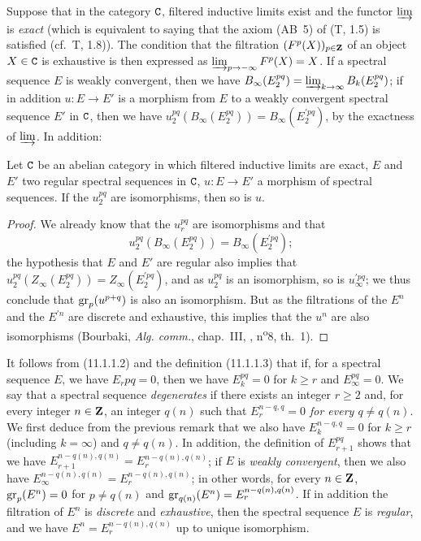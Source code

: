 \begin{env}[11.1.4]
\label{0.11.1.4}
Suppose that in the category $\mathtt{C}$, filtered inductive limits exist and the functor $\varinjlim$ is \emph{exact} (which is equivalent to saying that the axiom (AB~5) of (T, 1.5) is satisfied (cf.~T, 1.8)).
The condition that the filtration $(F^p(X))_{p\in\mathbf{Z}}$ of an object $X\in\mathtt{C}$ is exhaustive is then expressed as $\varinjlim_{p\to-\infty}F^p(X)=X$.
If a spectral sequence $E$ is weakly convergent, then we have $B_\infty(E_2^{pq})=\varinjlim_{k\to\infty}B_k(E_2^{pq})$; if in addition $u:E\to E'$ is a morphism from $E$ to a weakly convergent spectral sequence $E'$ in $\mathtt{C}$, then we have $u_2^{pq}(B_\infty(E_2^{pq}))=B_\infty(E_2^{\prime pq})$, by the exactness of $\varinjlim$.
In addition:
\end{env}

\begin{prop}[11.1.5]
\label{0.11.1.5}
Let $\mathtt{C}$ be an abelian category in which filtered inductive limits are exact, $E$ and $E'$ two regular spectral sequences in $\mathtt{C}$, $u:E\to E'$ a morphism of spectral sequences.
If the $u_2^{pq}$ are isomorphisms, then so is $u$.
\end{prop}

\begin{proof}
\label{proof-0.11.1.5}
We already know  that the $u_r^{pq}$ are isomorphisms and that
\[
  u_2^{pq}(B_\infty(E_2^{pq}))=B_\infty(E_2^{\prime pq});
\]
the hypothesis that $E$ and $E'$ are regular also implies that $u_2^{pq}(Z_\infty(E_2^{pq}))=Z_\infty(E_2^{\prime pq})$, and as $u_2^{pq}$ is an isomorphism, so is $u_\infty^{\prime pq}$; we thus conclude that ${\mathop{\mathrm{gr}}\nolimits}_p(u^{p+q})$ is also an isomorphism.
But as the filtrations of the $E^n$ and the $E^{\prime n}$ are discrete and exhaustive, this implies that the $u^n$ are also isomorphisms (Bourbaki, \emph{Alg. comm.}, chap.~III, , n\textsuperscript{o}8, th.~1).
\end{proof}

\begin{env}[11.1.6]
\label{0.11.1.6}
It follows from (11.1.1.2) and the definition (11.1.1.3) that if, for a spectral sequence $E$, we have $E_r{pq}=0$, then we have $E_k^{pq}=0$ for $k\geqslant r$ and $E_\infty^{pq}=0$.
We say that a spectral sequence \emph{degenerates} if there exists an integer $r\geqslant 2$ and, for every integer $n\in\mathbf{Z}$, an integer $q(n)$ such that \emph{$E_r^{n-q,q}=0$ for every $q\neq q(n)$}.
We first deduce from the previous remark that we also have $E_k^{n-q,q}=0$ for $k\geqslant r$ (including $k=\infty$) and $q\neq q(n)$.
In addition, the definition of $E_{r+1}^{pq}$ shows that we have $E_{r+1}^{n-q(n),q(n)}=E_r^{n-q(n),q(n)}$; if $E$ is \emph{weakly convergent}, then we also have $E_\infty^{n-q(n),q(n)}=E_r^{n-q(n),q(n)}$; in other words, for every $n\in\mathbf{Z}$, ${\mathop{\mathrm{gr}}\nolimits}_p(E^n)=0$ for $p\neq q(n)$ and ${\mathop{\mathrm{gr}}\nolimits}_{q(n)}(E^n)=E_r^{n-q(n),q(n)}$.
If in addition the filtration of $E^n$ is \emph{discrete} and \emph{exhaustive}, then the spectral sequence $E$ is \emph{regular}, and we have $E^n=E_r^{n-q(n),q(n)}$ up to unique isomorphism.
\end{env}

